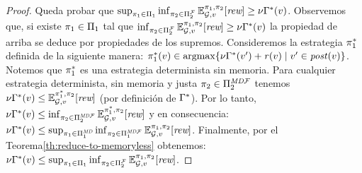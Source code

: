 \begin{proof}
  Queda probar que $\sup_{\pi_{1} \in \Pi_{1}}   \inf_{\pi_{2} \in \Pi^{\mathcal{F}}_{2}}  \mathbb{E}^{\pi_{1}, \pi_{2}}_{\mathcal{G},v}[\textit{rew}] \geq \nu \Gamma^*(v)$. Observemos que, si existe  $\pi_{1} \in \Pi_{1}$ tal que
  $\inf_{\pi_{2} \in \Pi^{\mathcal{F}}_{2}}  \mathbb{E}^{\pi_{1}, \pi_{2}}_{\mathcal{G},v}[\textit{rew}] \geq \nu \Gamma^*(v)$ la propiedad de arriba se deduce por propiedades de los supremos. Consideremos la estrategia $\pi^*_{1}$ definida de la siguiente manera:
  $\pi^*_{1}(v) \in \operatorname*{argmax} \{\nu \Gamma^*(v') + \mathit{r}(v) \mid v' \in \mathit{post}(v) \}$. Notemos que $\pi^*_{1}$ es una estrategia determinista sin memoria. Para cualquier estrategia determinista, sin memoria y justa $\pi_{2} \in \Pi^{\textit{MD}\mathcal{F}}_{2}$ tenemos
  $\nu \Gamma^*(v) \leq \mathbb{E}^{\pi^*_{1}, \pi_{2}}_{\mathcal{G},v}[\textit{rew}]$ (por definición de $\Gamma^*$).  Por lo tanto,
  $\nu \Gamma^*(v) \leq \inf_{\pi_{2} \in \Pi^{\textit{MD}\mathcal{F}}_{2}} \mathbb{E}^{\pi^*_{1}, \pi_{2}}_{\mathcal{G},v}[\textit{rew}]$
  y en consecuencia:
  $\nu \Gamma^*(v) \leq \sup_{\pi_{1} \in \Pi^{\textit{MD}}_{1}} \inf_{\pi_{2} \in \Pi^{\textit{MD}\mathcal{F}}_{1}} \mathbb{E}^{\pi_{1}, \pi_{2}}_{\mathcal{G},v}[\textit{rew}]$.
  Finalmente, por el Teorema\ref{th:reduce-to-memoryless} obtenemos:
  $\nu \Gamma^*(v) \leq \sup_{\pi_{1} \in \Pi_{1}} \inf_{\pi_{2} \in \Pi^{\mathcal{F}}_{2}} \mathbb{E}^{\pi_{1}, \pi_{2}}_{\mathcal{G},v}[\textit{rew}]$.
  \qedhere
\end{proof}
%
